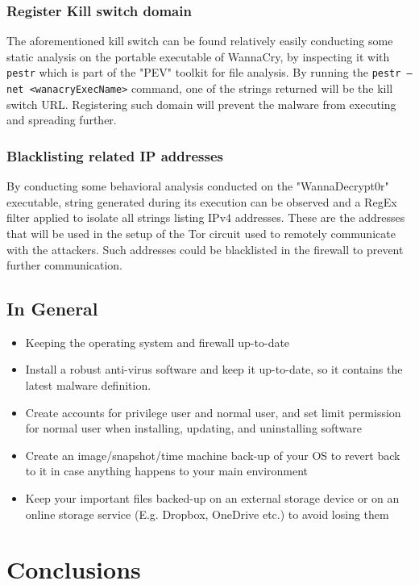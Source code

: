 \documentclass[10pt,a4paper]{article}
\begin{document}
\subsubsection{Register Kill switch domain}
The aforementioned kill switch can be found relatively easily conducting some static analysis on the portable executable of WannaCry, by inspecting it with \texttt{pestr} which is part of the "PEV" toolkit for file analysis. By running the \texttt{pestr --net <wanacryExecName>} command, one of the strings returned will be the kill switch URL. Registering such domain will prevent the malware from executing and spreading further.
\subsubsection{Blacklisting related IP addresses}
By conducting some behavioral analysis conducted on the "WannaDecrypt0r" executable, string generated during its execution can be observed and a RegEx filter applied to isolate all strings listing IPv4 addresses. These are the addresses that will be used in the setup of the Tor circuit used to remotely communicate with the attackers. Such addresses could be blacklisted in the firewall to prevent further communication.
\subsection{In General}
\begin{itemize}
\item Keeping the operating system and firewall up-to-date
\item Install a robust anti-virus software and keep it up-to-date, so it contains the latest malware definition.
\item Create accounts for privilege user and normal user, and set limit permission for normal user when installing, updating, and uninstalling software
\item Create an image/snapshot/time machine back-up of your OS to revert back to it in case anything happens to your main environment
\item Keep your important files backed-up on an external storage device or on an online storage service (E.g. Dropbox, OneDrive etc.) to avoid losing them
\end{itemize}


\section{Conclusions}
\end{document}
